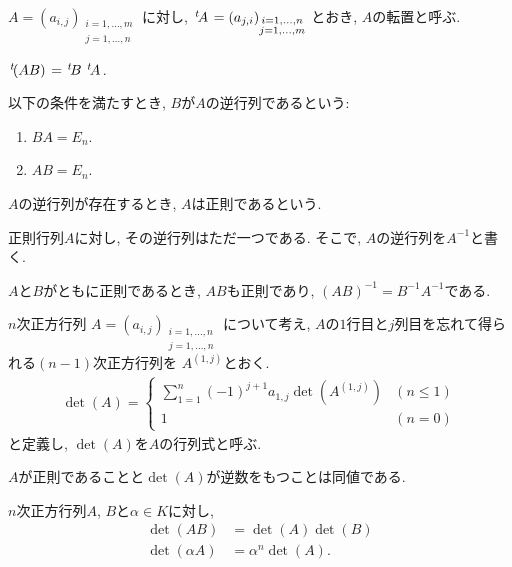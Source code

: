 $A=(a_{i,j})_{\substack{i=1,\ldots,m\\j=1,\ldots,n}}$
に対し,
$\left.^{t}\!A\right.=(a_{j,i})_{\substack{i=1,\ldots,n\\j=1,\ldots,m}}$
とおき,
$A$の転置と呼ぶ.
\begin{remark}
  $\left.^{t}\!(AB)\right.=\left.^{t}\!B\right.\left.^{t}\!A\right.$.
\end{remark}

\begin{definition}
  以下の条件を満たすとき,
  $B$が$A$の逆行列であるという:
  \begin{enumerate}
  \item $BA=E_n$.
  \item $AB=E_n$.
  \end{enumerate}
  $A$の逆行列が存在するとき,
  $A$は正則であるという.
\end{definition}
\begin{remark}
  正則行列$A$に対し,
  その逆行列はただ一つである.
  そこで, $A$の逆行列を$A^{-1}$と書く.
\end{remark}
\begin{remark}
  $A$と$B$がともに正則であるとき,
  $AB$も正則であり,
  $(AB)^{-1}=B^{-1}A^{-1}$である.
\end{remark}
\begin{definition}
  $n$次正方行列
  $A=(a_{i,j})_{\substack{i=1,\ldots,n\\j=1,\ldots,n}}$
  について考え,
  $A$の$1$行目と$j$列目を忘れて得られる$(n-1)$次正方行列を
  $A^{(1,j)}$とおく.
  \begin{align*}
    \det(A)=
    \begin{cases}
      \sum_{1=1}^n (-1)^{j+1}a_{1,j}\det (A^{(1,j)})& (n\leq 1)\\
      1& (n=0)
    \end{cases}
  \end{align*}
  と定義し, $\det(A)$を$A$の行列式と呼ぶ.
\end{definition}

\begin{remark}
  $A$が正則であることと$\det(A)$が逆数をもつことは同値である.
\end{remark}

\begin{remark}
  $n$次正方行列$A$, $B$と$\alpha\in K$に対し,
  \begin{align*}
    \det(AB)&=\det(A)\det(B)\\
    \det(\alpha A)&=\alpha^n\det(A).
  \end{align*}
\end{remark}

